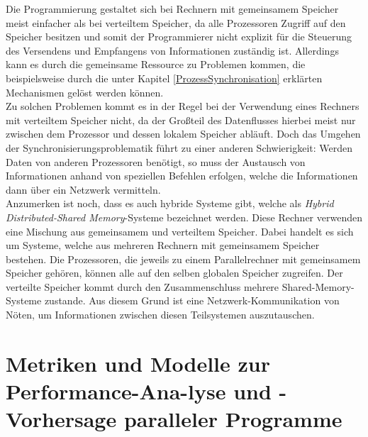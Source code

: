 				Die Programmierung gestaltet sich bei Rechnern mit gemeinsamem Speicher meist einfacher als bei verteiltem Speicher, da alle Prozessoren Zugriff auf den Speicher besitzen und somit der Programmierer nicht explizit für die Steuerung des Versendens und Empfangens von Informationen zuständig ist. Allerdings kann es durch die gemeinsame Ressource zu Problemen kommen, die beispielsweise durch die unter Kapitel \ref{ProzessSynchronisation} erklärten Mechanismen gelöst werden können.\\
				Zu solchen Problemen kommt es in der Regel bei der Verwendung eines Rechners mit verteiltem Speicher nicht, da der Großteil des Datenflusses hierbei meist nur zwischen dem Prozessor und dessen lokalem Speicher abläuft. Doch das Umgehen der Synchronisierungsproblematik führt zu einer anderen Schwierigkeit: Werden Daten von anderen Prozessoren benötigt, so muss der Austausch von Informationen anhand von speziellen Befehlen erfolgen, welche die Informationen dann über ein Netzwerk vermitteln. \cite{ParalleleNumerischeVerfahren}\\
				Anzumerken ist noch, dass es auch hybride Systeme gibt, welche als \textit{Hybrid Distributed-Shared Memory}-Systeme bezeichnet werden. Diese Rechner verwenden eine Mischung aus gemeinsamem und verteiltem Speicher. Dabei handelt es sich um Systeme, welche aus mehreren Rechnern mit gemeinsamem Speicher bestehen. Die Prozessoren, die jeweils zu einem Parallelrechner mit gemeinsamem Speicher gehören, können alle auf den selben globalen Speicher zugreifen. Der verteilte Speicher kommt durch den Zusammenschluss mehrere Shared-Memory-Systeme zustande. Aus diesem Grund ist eine Netzwerk-Kommunikation von Nöten, um Informationen zwischen diesen Teilsystemen auszutauschen. \cite{EntwicklungParallelerProgramme}
				
	\section{Metriken und Modelle zur Performance-Ana-lyse und -Vorhersage paralleler Programme}
		
